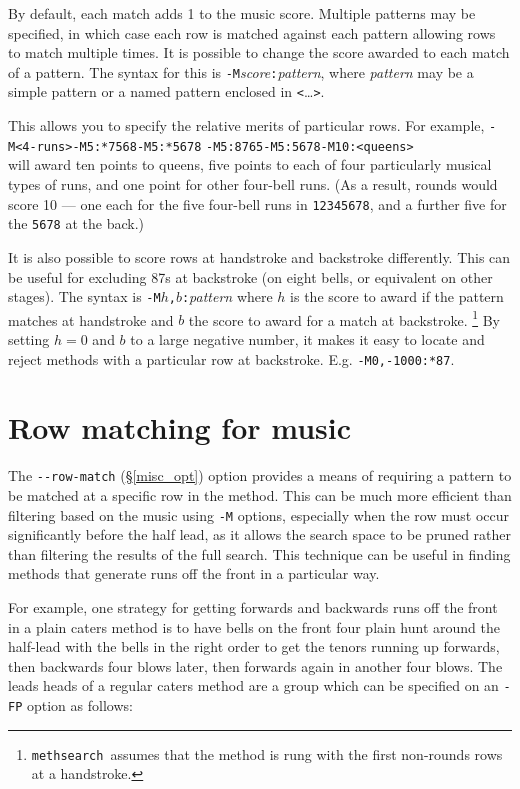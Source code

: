 \documentclass[a4paper,11pt,oneside]{book}
\makeatletter
\newcommand{\loi}[1]{\index{#1@{\hspace*{-\loptwidth}\texttt{--#1}}}}
\def\methsearch{\texttt{meth\-search}}
\newcommand{\sref}[1]{\hyperref[#1]{\S\ref{#1}}}
\makeatother
\begin{document}
By default, each match adds 1 to the music score.  Multiple patterns
may be specified, in which case each row is matched against each pattern
allowing rows to match multiple times.  It is possible to change the score
awarded to each match of a pattern.  The syntax for this is 
\verb+-M+\textit{score}\verb+:+\textit{pattern}, where \textit{pattern}
may be a simple pattern or a named pattern enclosed in \verb+<+\ldots\verb+>+.

This allows you to specify the relative merits of particular rows.  For 
example, \verb+-M<4-runs>+\hfill\verb+-M5:*7568+\hfill\verb+-M5:*5678+\hfill%
\verb+-M5:8765+\hfill\verb+-M5:5678+\hfill\verb+-M10:<queens>+\\
will award ten points to queens,
five points to each of four particularly musical types of runs, and one point
for other four-bell runs.  (As a result, rounds would score 10 --- one each
for the five four-bell runs in \verb+12345678+, and a further five for 
the \verb+5678+ at the back.)

It is also possible to score rows at handstroke and backstroke differently.
This can be useful for excluding 87s at backstroke (on eight bells, or 
equivalent on other stages).  The syntax is 
\verb+-M+$h$\verb+,+$b$\verb+:+\textit{pattern} where $h$ is the score
to award if the pattern matches at handstroke and 
$b$ the score to award for a match at backstroke.%
\footnote{\methsearch\ assumes that the method is rung with the first 
non-rounds rows at a handstroke.}
By setting $h=0$ and $b$ to a large negative number, it makes it easy to locate
and reject methods with a particular row at backstroke.  E.g.
\verb+-M0,-1000:*87+.

\section{Row matching for music}\label{pendrows}

The \verb+--row-match+\loi{row-match} (\sref{misc_opt}) option provides
a means of requiring a pattern to be matched at a specific row in the
method.  This can be much more efficient than filtering based on the
music using \verb+-M+ options, especially when the row must occur
significantly before the half lead, as it allows the search space to be
pruned rather than filtering the results of the full search.
This technique can be useful in finding methods that generate runs off
the front in a particular way.

For example, one strategy for getting forwards and backwards runs off
the front in a plain caters method is to have bells on the front four
plain hunt around the half-lead with the bells in the right order to get
the tenors running up forwards, then backwards four blows later, then
forwards again in another four blows.  The leads heads of a regular
caters method are a group which can be specified on an \verb+-FP+ option
as follows:
\end{document}
